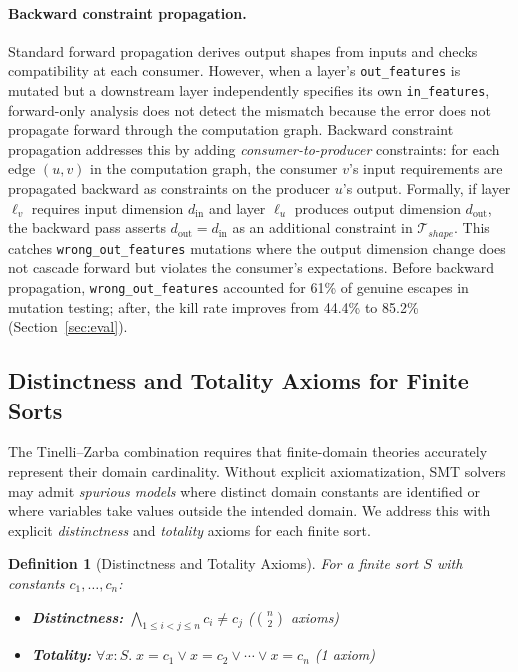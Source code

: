 \documentclass[11pt]{article}
\newtheorem{definition}[theorem]{Definition}
\begin{document}
\paragraph{Backward constraint propagation.}
Standard forward propagation derives output shapes from inputs and
checks compatibility at each consumer.  However, when a layer's
\texttt{out\_features} is mutated but a downstream layer independently
specifies its own \texttt{in\_features}, forward-only analysis does not
detect the mismatch because the error does not propagate forward through
the computation graph.  Backward constraint propagation addresses this by
adding \emph{consumer-to-producer} constraints: for each edge $(u, v)$
in the computation graph, the consumer $v$'s input requirements are
propagated backward as constraints on the producer $u$'s output.
Formally, if layer $\ell_v$ requires input dimension $d_{\mathrm{in}}$
and layer $\ell_u$ produces output dimension $d_{\mathrm{out}}$, the
backward pass asserts $d_{\mathrm{out}} = d_{\mathrm{in}}$ as an
additional constraint in $\mathcal{T}_{\mathit{shape}}$.  This catches
\texttt{wrong\_out\_features} mutations where the output dimension change
does not cascade forward but violates the consumer's expectations.
Before backward propagation, \texttt{wrong\_out\_features} accounted
for 61\% of genuine escapes in mutation testing; after, the kill rate
improves from 44.4\% to 85.2\% (Section~\ref{sec:eval}).

\subsection{Distinctness and Totality Axioms for Finite Sorts}\label{sec:distinctness}

The Tinelli--Zarba combination requires that finite-domain theories
accurately represent their domain cardinality.  Without explicit
axiomatization, SMT solvers may admit \emph{spurious models} where
distinct domain constants are identified or where variables take
values outside the intended domain.  We address this with explicit
\emph{distinctness} and \emph{totality} axioms for each finite sort.

\begin{definition}[Distinctness and Totality Axioms]\label{def:distinct-total}
For a finite sort $S$ with constants $c_1, \ldots, c_n$:
\begin{itemize}[nosep,leftmargin=2em]
  \item \textbf{Distinctness:} $\bigwedge_{1 \leq i < j \leq n} c_i \neq c_j$
    \hfill ($\binom{n}{2}$ axioms)
  \item \textbf{Totality:} $\forall x : S.\; x = c_1 \lor x = c_2 \lor \cdots \lor x = c_n$
    \hfill (1 axiom)
\end{itemize}
\end{definition}
\end{document}
